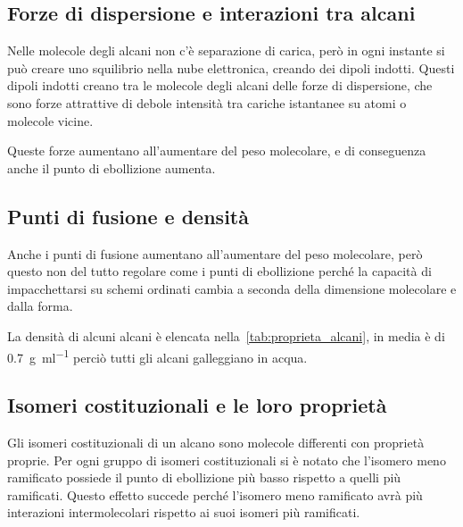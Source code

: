 \subsection{Forze di dispersione e interazioni tra alcani}
Nelle molecole degli alcani non c'è separazione di carica, però in ogni instante si può creare uno squilibrio nella nube elettronica, creando dei dipoli indotti. Questi dipoli indotti creano tra le molecole degli alcani delle forze di dispersione, che sono forze attrattive di debole intensità tra cariche istantanee su atomi o molecole vicine.

Queste forze aumentano all'aumentare del peso molecolare, e di conseguenza anche il punto di ebollizione aumenta.

\subsection{Punti di fusione e densità}
Anche i punti di fusione aumentano all'aumentare del peso molecolare, però questo non del tutto regolare come i punti di ebollizione perché la capacità di impacchettarsi su schemi ordinati cambia a seconda della dimensione molecolare e dalla forma.

La densità di alcuni alcani è elencata nella~\autoref{tab:proprieta_alcani}, in media è di \qty{0.7}{\g\per\ml} perciò tutti gli alcani galleggiano in acqua.

\subsection{Isomeri costituzionali e le loro proprietà}
Gli isomeri costituzionali di un alcano sono molecole differenti con proprietà proprie. Per ogni gruppo di isomeri costituzionali si è notato che l'isomero meno ramificato possiede il punto di ebollizione più basso rispetto a quelli più ramificati. Questo effetto succede perché l'isomero meno ramificato avrà più interazioni intermolecolari rispetto ai suoi isomeri più ramificati.

